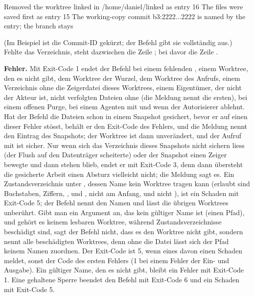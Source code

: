 \starttyping
Removed the worktree linked in /home/daniel/linked as entry 16
The files were saved first as entry 15
The working-copy commit b3:2222...2222 is named by the entry; the branch stays
\stoptyping

(Im Beispiel ist die Commit-ID gekürzt; der Befehl gibt sie vollständig aus.) Fehlte das
Verzeichnis, steht dazwischen die Zeile ; bei  davor die Zeile .

{\bf Fehler.} Mit Exit-Code 1 endet der Befehl bei einem fehlenden , einem
Worktree, den es nicht gibt, dem Worktree der Wurzel, dem Worktree des Aufrufs, einem Verzeichnis
ohne die Zeigerdatei dieses Worktrees, einem Eigentümer, der nicht der Akteur ist, nicht
verfolgten Dateien ohne  (die Meldung nennt die ersten), bei einem offenen Purge,
bei einem Agenten mit  und wenn der Autorisierer  ablehnt.
Hat der Befehl die Dateien schon in einem Snapshot gesichert, bevor er auf einen dieser Fehler
stösst, behält er den Exit-Code des Fehlers, und die Meldung nennt den Eintrag des Snapshots; der
Worktree ist dann unverändert, und der Aufruf mit  ist sicher. Nur wenn sich das
Verzeichnis dieses Snapshots nicht sichern liess (der Flush auf den Datenträger scheiterte) oder
der Snapshot einen Zeiger bewegte und dann stehen blieb, endet er mit Exit-Code 3,
denn dann übersteht die gesicherte Arbeit einen Absturz
vielleicht nicht; die Meldung sagt es.
Ein Zustandsverzeichnis unter , dessen Name kein Worktree tragen kann
(erlaubt sind Buchstaben, Ziffern, \type{-}, \type{_} und , nicht am Anfang, und nicht
), ist ein Schaden mit Exit-Code 5; der Befehl nennt den Namen und lässt die übrigen
Worktrees unberührt.
Gibt man ein Argument an, das kein gültiger Name ist (einen Pfad), und gehört es keinem
lesbaren Worktree, während Zustandsverzeichnisse beschädigt sind, sagt der Befehl nicht, dass es
den Worktree nicht gibt, sondern nennt alle beschädigten Worktrees, denn ohne die Datei
 lässt sich der Pfad keinem Namen zuordnen. Der Exit-Code ist 5, wenn eines davon
einen Schaden meldet, sonst der Code des ersten Fehlers (1 bei einem Fehler der Ein- und Ausgabe).
Ein gültiger Name, den es nicht gibt, bleibt ein Fehler mit Exit-Code 1.
Eine gehaltene Sperre beendet den Befehl mit Exit-Code 6 und ein Schaden mit Exit-Code 5.

